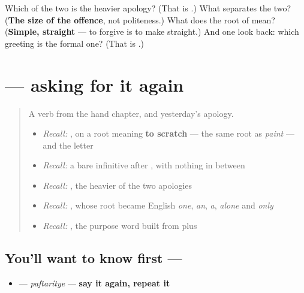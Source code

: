 \begin{tcolorbox}[breakable,colback=teal!4,colframe=teal!35!black,title={Before you move on}]
Which of the two is the heavier apology? (That is \textbf{}.) What separates the two? (\textbf{The size of the offence}, not politeness.) What does the root of \textbf{} mean? (\textbf{Simple, straight} — to forgive is to make straight.) And one look back: which greeting is the formal one? (That is \textbf{}.)
\end{tcolorbox}
\section[\texorpdfstring{\ru{повторите} (paftarítye)}{повторите (paftarítye)}]{ — asking for it again}

\label{lesson:RU-C21-povtorite}



\begin{quote}
A verb from the hand chapter, and yesterday's apology.

\begin{itemize}
\raggedright
  \item \emph{Recall:} \emph{}, on a root meaning \textbf{to scratch} — the same root as \emph{paint} — and the letter \textbf{}
  \item \emph{Recall:} a bare infinitive after \emph{ }, with nothing in between
  \item \emph{Recall:} \emph{}, the heavier of the two apologies
  \item \emph{Recall:} \emph{}, whose root became English \emph{one}, \emph{an}, \emph{a}, \emph{alone} and \emph{only}
  \item \emph{Recall:} \emph{}, the purpose word built from \textbf{} plus \textbf{}
\end{itemize}
\end{quote}

\subsection*{You'll want to know first — }
\begin{itemize}
\raggedright
  \item \textbf{} — \emph{paftarítye} — \textbf{say it again, repeat it}
\end{itemize}

